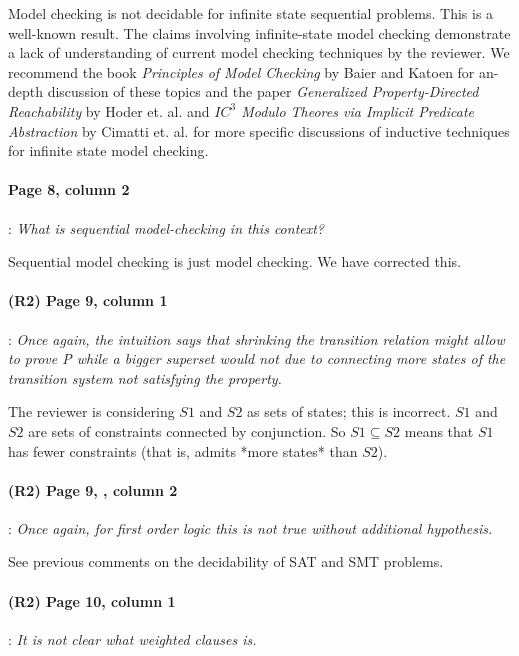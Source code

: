 \documentclass{article}
\begin{document}
Model checking is not decidable for infinite state sequential problems.  This is a well-known result.  The claims involving infinite-state model checking demonstrate a lack of understanding of current model checking techniques by the reviewer.  We recommend the book {\em Principles of Model Checking} by Baier and Katoen for an-depth discussion of these topics and the paper {\em Generalized Property-Directed Reachability} by Hoder et. al.  and {\em $IC^{3}$ Modulo Theores via Implicit Predicate Abstraction} by Cimatti et. al. for more specific discussions of inductive techniques for infinite state model checking.


\paragraph{Page 8, column 2}: \textit{What is sequential model-checking in this context?}
\vspace{0.05in}


\noindent Sequential model checking is just model checking. We have corrected this.


\paragraph{(R2) Page 9, column 1}: \textit{Once again, the intuition says that shrinking the transition relation might allow to prove P while a bigger superset would not due to connecting more states of the transition system not satisfying the property.}
\vspace{0.05in}

\noindent The reviewer is considering $S1$ and $S2$ as sets of states; this is incorrect.  $S1$ and $S2$ are sets of constraints connected by conjunction.  So $S1 \subseteq S2$ means that $S1$ has fewer constraints (that is, admits *more states* than $S2$).

\paragraph{(R2) Page 9, , column 2}: \textit{Once again, for first order logic this is not true without additional hypothesis.}
\vspace{0.05in}

\noindent See previous comments on the decidability of SAT and SMT problems.

\paragraph{(R2) Page 10, column 1}: \textit{It is not clear what weighted clauses is.}
\vspace{0.05in}
\end{document}
